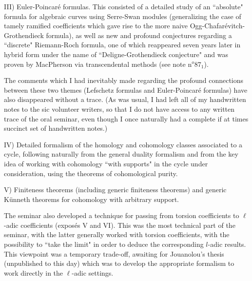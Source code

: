 III) Euler-Poincar\'e formulas. This consisted of a detailed study of an ``absolute" formula for algebraic curves using Serre-Swan modules (generalizing the case of tamely ramified coefficients which gave rise to the more naive Ogg-Chafar\'evitch-Grothendieck formula), as well as new and profound conjectures regarding a ``discrete" Riemann-Roch formula, one of which reappeared seven years later in hybrid form under the name of ``Deligne-Grothendieck conjecture" and was proven by MacPherson via transcendental methods (see note n$^{o}87_1$).

The comments which I had inevitably made regarding the profound connections between these two themes (Lefschetz formulas and Euler-Poincar\'e formulas) have also disappeared without a trace. (As was usual, I had left all of my handwritten notes to the sic volunteer writers, so that I do not have access to any written trace of the oral seminar, even though I once naturally had a complete if at times succinct set of handwritten notes.)

IV) Detailed formalism of the homology and cohomology classes associated to a cycle, following naturally from the general duality formalism and from the key idea of working with cohomology ``with supports" in the cycle under consideration, using the theorems of cohomological purity.

V) Finiteness theorems (including generic finiteness theorems) and generic K\"unneth theorems for cohomology with arbitrary support.

The seminar also developed a technique for passing from torsion coefficients to $\ell$-adic coefficients (expos\'es V and VI). This was the most technical part of the seminar, with the latter generally worked with torsion coefficients, with the possibility to ``take the limit" in order to deduce the corresponding $l$-adic results. This viewpoint was a temporary trade-off, awaiting for Jouanolou's thesis (unpublished to this day) which was to develop the appropriate formalism to work directly in the $\ell$-adic settings.

